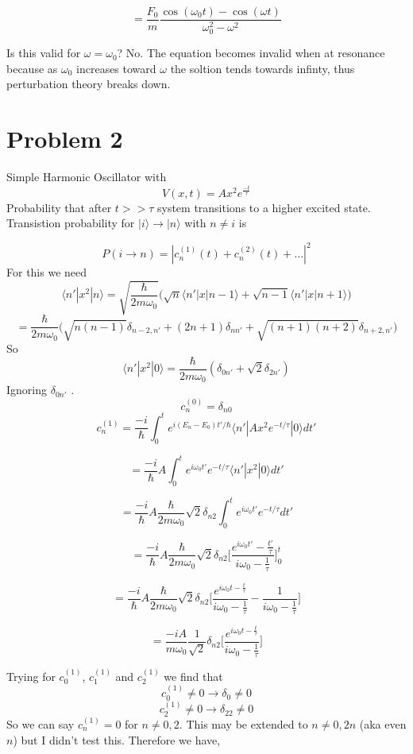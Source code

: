 \documentclass[12pt]{article}
\newcommand{\ket}[1]{\vert{#1}\rangle}
\begin{document}
$$ = \frac{F_0}{m} \frac{\cos(\omega_0 t) - \cos(\omega t)}{\omega_0^2 - \omega^2} $$

Is this valid for $\omega = \omega_0 $? No. The equation becomes invalid when at resonance because as $\omega_0$ increases toward $\omega$ the soltion tends towards infinty, thus perturbation theory breaks down. 




\section*{Problem 2} 
Simple Harmonic Oscillator with 
$$ V(x,t) = Ax^2 e^{\frac{-t}{\tau}} $$
Probability that after $t >> \tau $ system transitions to a higher excited state. Transistion probability for $\ket{i} \rightarrow \ket{n}$ with $n \neq i$ is 

$$ P(i \rightarrow n) = | c_n^{(1)} (t) + c_n^{(2)} (t) + \ldots |^2 $$
For this we need 
$$ \langle n' | x^2 | n \rangle = \sqrt{\frac{\hbar}{2 m \omega_0}} \Big( \sqrt{n} \langle n' | x | n-1 \rangle + \sqrt{n-1} \langle n' | x | n+1 \rangle \Big) $$
$$ = \frac{\hbar}{2 m \omega_0} \Big( \sqrt{n(n-1) } \delta_{n-2, n'} + (2n +1 ) \delta_{nn'} + \sqrt{(n+1)(n+2) } \delta_{n+2, n'} \Big) $$
So 
$$ \langle n' | x^2 | 0 \rangle = \frac{\hbar}{2m\omega_0} ( \delta_{0n'} + \sqrt{2} \delta_{2n'} ) $$
Ignoring $\delta_{0n'}$ .
$$ c_n^{(0)} = \delta_{n0} $$
$$ c_n^{(1)} = \frac{-i}{\hbar} \int_0^t e^{i(E_n - E_0) t' / \hbar} \langle n' | Ax^2 e^{-t/ \tau} | 0 \rangle dt' $$

$$ = \frac{-i}{\hbar} A \int_0^t e^{i \omega_0 t'} e^{-t / \tau} \langle n' | x^2 | 0 \rangle dt' $$


$$ = \frac{-i}{\hbar} A \frac{\hbar}{2m \omega_0} \sqrt{2} \delta_{n2} \int_0^t e^{i \omega_0 t'} e^{-t / \tau} dt' $$

$$ = \frac{-i}{\hbar} A \frac{\hbar}{2 m \omega_0} \sqrt{2} \delta_{n2} \Big[ \frac{e^{i \omega_0 t'} - \frac{t'}{\tau} }{i \omega_0 - \frac{1}{\tau} } \Big]_0^t $$

$$ = \frac{-i}{\hbar} A \frac{\hbar}{2 m \omega_0} \sqrt{2} \delta_{n2} \Big[ \frac{e^{i \omega_0 t - \frac{t}{\tau} } }{i \omega_0 - \frac{1}{\tau} } - \frac{1}{i \omega_0 - \frac{1}{\tau}} \Big] $$

$$ = \frac{-i A}{m \omega_0} \frac{1}{\sqrt{2}} \delta_{n2} \Big[ \frac{e^{i \omega_0 t - \frac{t}{\tau}} }{i \omega_0 - \frac{1}{\tau} } \Big] $$

Trying for $c_0^{(1)}$, $c_{1}^{(1)} $ and  $ c_{2}^{(1)}$ we find that 
$$ c_0^{(1)} \neq 0 \rightarrow \delta_0 \neq 0 $$
$$ c_2^{(1)} \neq 0 \rightarrow \delta_{22} \neq 0 $$
So we can say $c_n^{(1)} = 0$ for $n \neq 0, 2$. This may be extended to $n \neq 0, 2n$ (aka even $n$) but I didn't test this. Therefore we have, 
\end{document}
